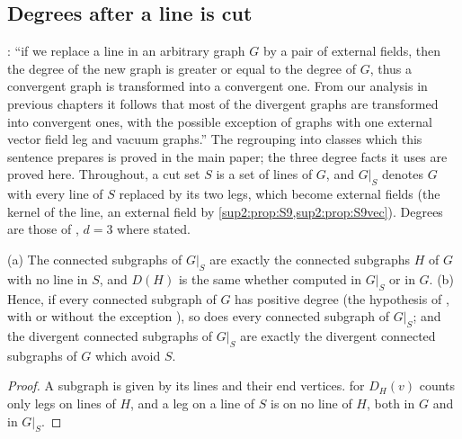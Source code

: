 
\subsection{Degrees after a line is cut}\label{sup2:ssec:cut}

\cite[p.~432]{Ba3}: ``if we replace a line in an arbitrary graph $G$ by a pair of external fields, then the degree of the new graph is greater or equal to the degree of $G$, thus a convergent graph is transformed into a convergent one. From our analysis in previous chapters it follows that most of the divergent graphs are transformed into convergent ones, with the possible exception of graphs with one external vector field leg and vacuum graphs.'' The regrouping into classes which this sentence prepares is proved in the main paper; the three degree facts it uses are proved here. Throughout, a cut set $S$ is a set of lines of $G$, and $G|_S$ denotes $G$ with every line of $S$ replaced by its two legs, which become external fields (the kernel of the line, an external field by \cref{sup2:prop:S9,sup2:prop:S9vec}). Degrees are those of \cite[(2.1)--(2.3)]{Ba3}, $d=3$ where stated.

\begin{lemma}\label{sup2:lem:cut1}
\textup{(a)} The connected subgraphs of $G|_S$ are exactly the connected subgraphs $H$ of $G$ with no line in $S$, and $D(H)$ is the same whether computed in $G|_S$ or in $G$. \textup{(b)} Hence, if every connected subgraph of $G$ has positive degree (the hypothesis of \cite[Prop.~2.1]{Ba3}, with or without the exception \cite[(2.4)]{Ba3}), so does every connected subgraph of $G|_S$; and the divergent connected subgraphs of $G|_S$ are exactly the divergent connected subgraphs of $G$ which avoid $S$.
\end{lemma}

\begin{proof}
A subgraph is given by its lines and their end vertices. \cite[(2.1)]{Ba3} for $D_H(v)$ counts only legs on lines of $H$, and a leg on a line of $S$ is on no line of $H$, both in $G$ and in $G|_S$.
\end{proof}

